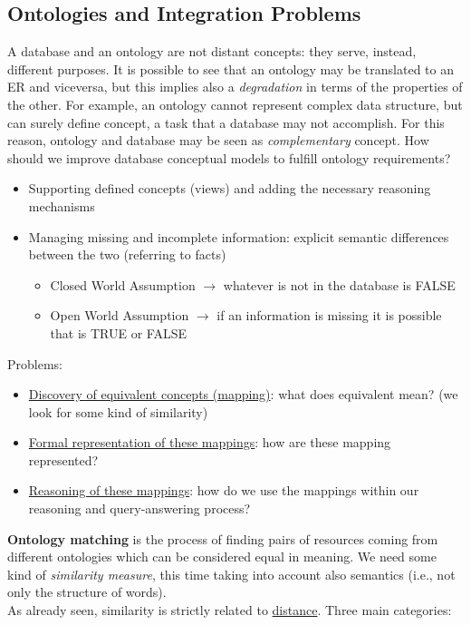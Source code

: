 \documentclass[10pt,a4paper]{article}
\begin{document}
\begin{justify}
\subsection{Ontologies and Integration Problems}
A database and an ontology are not distant concepts: they serve, instead, different purposes. It is possible to see that an ontology may be translated to an ER and viceversa, but this implies also a \textit{degradation} in terms of the properties of the other. For example, an ontology cannot represent complex data structure, but can surely define concept, a task that a database may not accomplish.
For this reason, ontology and database may be seen as \textit{complementary} concept.
How should we improve database conceptual models to fulfill ontology requirements?
\begin{itemize}
	\item Supporting defined concepts (views) and adding the necessary reasoning mechanisms
	\item Managing missing and incomplete information: explicit semantic differences between the two (referring to facts)
	\begin{itemize}
		\item Closed World Assumption $\rightarrow$ whatever is not in the database is FALSE
		\item Open World Assumption $\rightarrow$ if an information is missing it is possible that is TRUE or FALSE
	\end{itemize}
\end{itemize}
Problems:
\begin{itemize}
	\item \uline{Discovery of equivalent concepts (mapping)}: what does equivalent mean? (we look for some kind of similarity)
	\item \uline{Formal representation of these mappings}: how are these mapping represented?
	\item \uline{Reasoning of these mappings}: how do we use the mappings within our reasoning and query-answering process?
\end{itemize}
\textbf{Ontology matching} is the process of finding pairs of resources coming from different ontologies which can be considered equal in meaning. We need some kind of \textit{similarity measure}, this time taking into account also semantics (i.e., not only the structure of words). \\
As already seen, similarity is strictly related to \uline{distance}. 
Three main categories:
\begin{itemize}

\end{itemize}
\end{justify}
\end{document}
